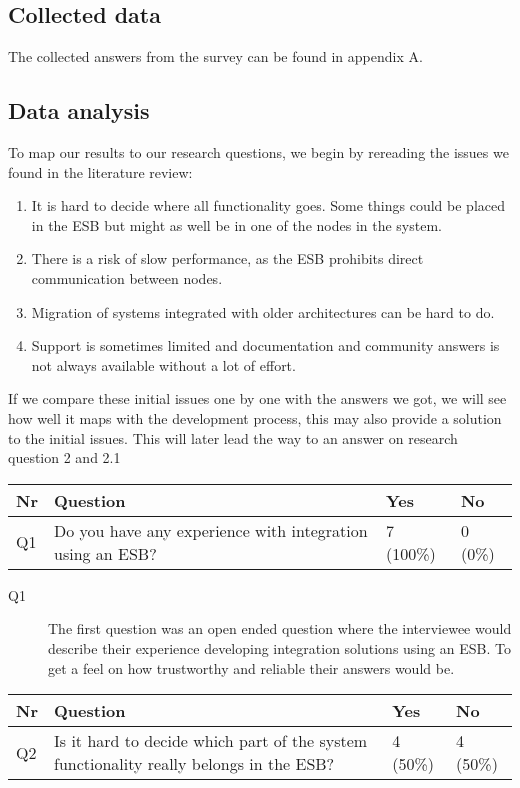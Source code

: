 \documentclass{llncs}
\begin{document}
\subsection{Collected data}
The collected answers from the survey can be found in appendix A.

\subsection{Data analysis}

To map our results to our research questions, we begin by rereading the issues we found in the literature review:

\begin{enumerate}
\item It is hard to decide where all functionality goes. Some things could be placed in the ESB but might as well be in one of the nodes in the system.
\item There is a risk of slow performance, as the ESB prohibits direct communication between nodes.
\item Migration of systems integrated with older architectures can be hard to do.
\item Support is sometimes limited and documentation and community answers is not always available without a lot of effort.
\end{enumerate}

If we compare these initial issues one by one with the answers we got, we will see how well it maps with the development process, this may also provide a solution to the initial issues. This will later lead the way to an answer on research question 2 and 2.1

\begin{tabular}{ | l | p{9cm} | l | l |}
\hline
Nr & Question & Yes & No \\ \hline
Q1 & Do you have any experience with integration using an ESB? & 7 (100\%) & 0 (0\%) \\ \hline
\end{tabular}

\begin{description}
\item[Q1] The first question was an open ended question where the interviewee would describe their experience developing integration solutions using an ESB. To get a feel on how trustworthy and reliable their answers would be.
\end{description}

\begin{tabular}{ | l | p{9cm} | l | l |}
\hline
Nr & Question & Yes & No \\ \hline
Q2 & Is it hard to decide which part of the system functionality really belongs in the ESB? & 4 (50\%) & 4 (50\%)\\ \hline
\end{tabular}
\end{document}
